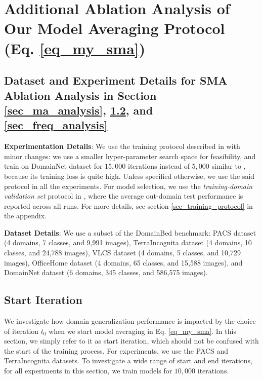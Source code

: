 \section{Additional Ablation Analysis of Our Model Averaging Protocol (Eq. \ref{eq_my_sma})}
\label{sec_ablation_sm}

\subsection{Dataset and Experiment Details for SMA Ablation Analysis in Section \ref{sec_ma_analysis}, \ref{sec_start_iter}, and \ref{sec_freq_analysis}}

\textbf{Experimentation Details}: We use the training protocol described in \cite{gulrajani2020search} with minor changes: we use a smaller hyper-parameter search space for feasibility, and train on DomainNet dataset for $15,000$ iterations instead of $5,000$ similar to \cite{cha2021swad}, because its training loss is quite high. Unless specified otherwise, we use the said protocol in all the experiments. For model selection, we use the \textit{training-domain validation set} protocol in \cite{gulrajani2020search}, where the average out-domain test performance is reported across all runs. For more details, see section \ref{sec_training_protocol} in the appendix. 

\textbf{Dataset Details}: We use a subset of the DomainBed benchmark: PACS dataset (4 domains, 7 classes, and 9,991 images), TerraIncognita dataset (4 domains, 10 classes, and 24,788 images), VLCS dataset (4 domains, 5 classes, and 10,729 images), OfficeHome dataset (4 domains, 65 classes, and 15,588 images), and DomainNet dataset (6 domains, 345 classes, and 586,575 images).


\subsection{Start Iteration}
\label{sec_start_iter}

We investigate how domain generalization performance is impacted by the choice of iteration $t_0$ when we start model averaging in Eq. \ref{eq_my_sma}. In this section, we simply refer to it as start iteration, which should not be confused with the start of the training process. 
For experiments, we use the PACS and TerraIncognita datasets. To investigate a wide range of start and end iterations, for all experiments in this section, we train models for $10,000$ iterations. 

